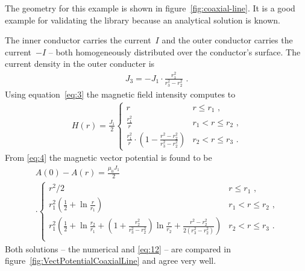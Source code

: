 The geometry for this example is shown in figure~\ref{fig:coaxial-line}.
It is a good example for validating the library because an analytical
solution is known.  \par The inner conductor carries the current~$I$
and the outer conductor carries the current~$-I$ -- both homogeneously
distributed over the conductor's surface.  The current density in the
outer conducter is
\begin{gather}
  J_3=-J_1\cdot\frac{r_1^2}{r_3^2-r_2^2}\text{~.}
\end{gather}
Using equation~\eqref{eq:3} the magnetic field intensity computes to
\begin{gather}
  H(r)= \frac{J_1}{2}
  \begin{cases}
    r & r \le r_1\text{~,} \\
    \frac{r_1^2}{r} & r_1 < r \le r_2\text{~,} \\
    \frac{r_1^2}{r}\cdot\left(1-\frac{r^2-r_2^2}{r_3^2-r_2^2}\right)
    & r_2 < r \le r_3\text{~.}
  \end{cases}
\end{gather}
From \eqref{eq:4} the magnetic vector potential is found to be
\begin{multline}
\label{eq:12}
  A(0)-A(r) = \frac{\mu_0J_1}{2} \\ \cdot
  \begin{cases}
    r^2/2 & r \le r_1\text{~,} \\
    r_1^2\left(\frac{1}{2}+\ln\frac{r}{r_1}\right)
    & r_1 < r \le r_2\text{~,} \\
    r_1^2\left(\frac{1}{2}+\ln\frac{r_2}{r_1}
      +(1+\frac{r_2^2}{r_3^2-r_2^2})\ln\frac{r}{r_2}
      +\frac{r^2-r_2^2}{2(r_3^2-r_2^2)}\right)
    & r_2 < r \le r_3\text{~.} \\
  \end{cases}
\end{multline}
Both solutions -- the numerical and \eqref{eq:12} -- are compared in
figure~\ref{fig:VectPotentialCoaxialLine} and agree very well.
